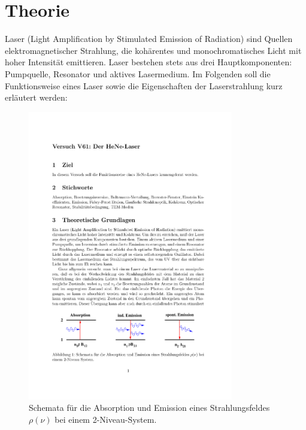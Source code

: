 \section{Theorie}
\label{sec:theorie}

Laser (Light Amplification by Stimulated Emission of Radiation) sind Quellen
elektromagnetischer Strahlung, die kohärentes und monochromatisches Licht mit
hoher Intensität emittieren. Laser bestehen stets aus drei Hauptkomponenten:
Pumpquelle, Resonator und aktives Lasermedium. Im Folgenden soll die
Funktionsweise eines Laser sowie die Eigenschaften der Laserstrahlung kurz
erläutert werden:

\begin{figure}[htb]
  \centering
  \includegraphics[width=0.8\textwidth]{figures/fig_Übergänge.pdf}
  \caption{Schemata für die Absorption und Emission eines
  Strahlungsfeldes~$\rho(\nu)$ bei einem \num{2}-Niveau-System.}
  \label{fig:Übergänge}
\end{figure}


